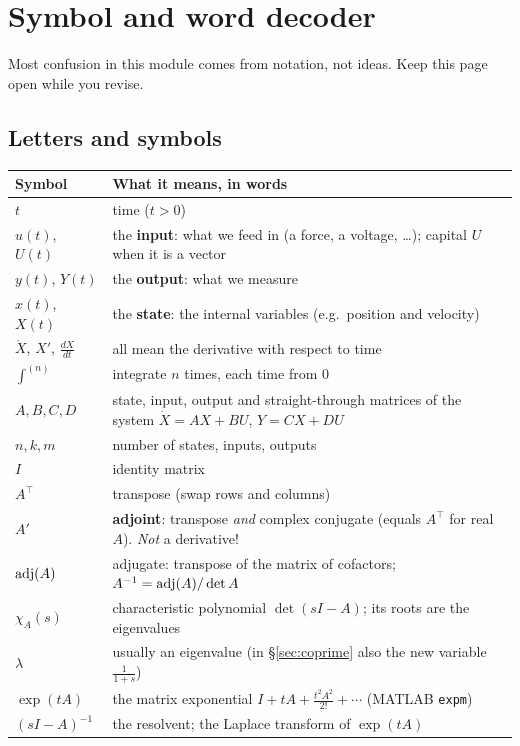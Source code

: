 \section{Symbol and word decoder}\label{sec:decoder}
Most confusion in this module comes from notation, not ideas. Keep this page open while you revise.

\subsection*{Letters and symbols}
\begin{center}
\renewcommand{\arraystretch}{1.35}
\small
\begin{tabular}{@{}p{3.2cm}p{12cm}@{}}
\toprule
\textbf{Symbol} & \textbf{What it means, in words}\\\midrule
$t$ & time ($t>0$)\\
$u(t)$, $U(t)$ & the \textbf{input}: what we feed in (a force, a voltage, \dots); capital $U$ when it is a vector\\
$y(t)$, $Y(t)$ & the \textbf{output}: what we measure\\
$x(t)$, $X(t)$ & the \textbf{state}: the internal variables (e.g.\ position and velocity)\\
$\dot X$, $X'$, $\frac{dX}{dt}$ & all mean the derivative with respect to time\\
$\int^{(n)}$ & integrate $n$ times, each time from $0$\\
$A,B,C,D$ & state, input, output and straight-through matrices of the system $\dot X=AX+BU$, $Y=CX+DU$\\
$n,k,m$ & number of states, inputs, outputs\\
$I$ & identity matrix\\
$A^\top$ & transpose (swap rows and columns)\\
$A'$ & \textbf{adjoint}: transpose \emph{and} complex conjugate (equals $A^\top$ for real $A$). \emph{Not} a derivative!\\
$\operatorname{adj}(A)$ & adjugate: transpose of the matrix of cofactors; $A^{-1}=\operatorname{adj}(A)/\det A$\\
$\chi_A(s)$ & characteristic polynomial $\det(sI-A)$; its roots are the eigenvalues\\
$\lambda$ & usually an eigenvalue (in \S\ref{sec:coprime} also the new variable $\frac1{1+s}$)\\
$\exp(tA)$ & the matrix exponential $I+tA+\frac{t^2A^2}{2!}+\cdots$ (MATLAB \texttt{expm})\\
$(sI-A)^{-1}$ & the resolvent; the Laplace transform of $\exp(tA)$\\

\end{tabular}
\end{center}
